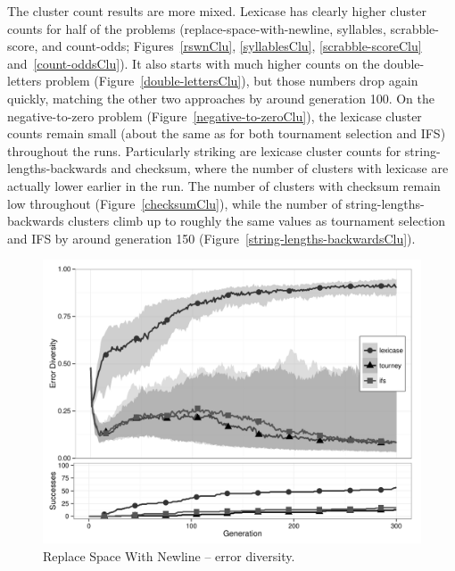 The cluster count results are more mixed. Lexicase has clearly higher cluster counts for
half of the problems (replace-space-with-newline, syllables, scrabble-score, and count-odds;
Figures~\ref{rswnClu}, \ref{syllablesClu}, \ref{scrabble-scoreClu} and~\ref{count-oddsClu}).
It also starts with much higher counts on the double-letters problem (Figure~\ref{double-lettersClu}), 
but those numbers drop again quickly, matching the other two approaches by around generation 100. 
On the negative-to-zero problem (Figure~\ref{negative-to-zeroClu}), the lexicase
cluster counts remain small (about the same as for both tournament selection and IFS) throughout the runs.
Particularly striking are lexicase cluster counts for string-lengths-backwards and checksum, where the
number of clusters with lexicase are actually lower earlier in the run. The number of clusters with
checksum remain low throughout (Figure~\ref{checksumClu}), while the number of string-lengths-backwards 
clusters climb up to roughly the same values as tournament selection and IFS by around generation 150 
(Figure~\ref{string-lengths-backwardsClu}).

\begin{figure}[p] %
\centering
\includegraphics[width=11.5cm]{replace-space-with-newline-diversity.pdf}
\caption{Replace Space With Newline -- error diversity.}
\label{rswnDiv}
\end{figure}

